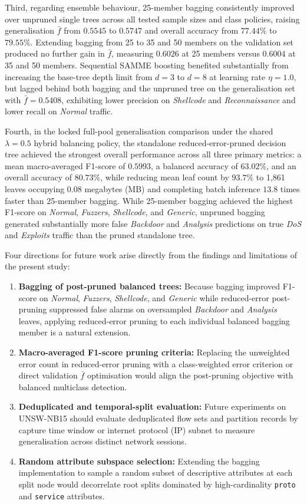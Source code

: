 Third, regarding ensemble behaviour, 25-member bagging consistently improved over unpruned single trees across all tested sample sizes and class policies, raising generalisation $\bar{f}$ from $0.5545$ to $0.5747$ and overall accuracy from $77.44\%$ to $79.55\%$. Extending bagging from 25 to 35 and 50 members on the validation set produced no further gain in $\bar{f}$, measuring $0.6026$ at 25 members versus $0.6004$ at 35 and 50 members. Sequential SAMME boosting benefited substantially from increasing the base-tree depth limit from $d = 3$ to $d = 8$ at learning rate $\eta = 1.0$, but lagged behind both bagging and the unpruned tree on the generalisation set with $\bar{f} = 0.5408$, exhibiting lower precision on \emph{Shellcode} and \emph{Reconnaissance} and lower recall on \emph{Normal} traffic.

Fourth, in the locked full-pool generalisation comparison under the shared $\lambda = 0.5$ hybrid balancing policy, the standalone reduced-error-pruned decision tree achieved the strongest overall performance across all three primary metrics: a mean macro-averaged F1-score of $0.5993$, a balanced accuracy of $63.02\%$, and an overall accuracy of $80.73\%$, while reducing mean leaf count by $93.7\%$ to 1,861 leaves occupying $0.08$ megabytes (MB) and completing batch inference $13.8$ times faster than 25-member bagging. While 25-member bagging achieved the highest F1-score on \emph{Normal}, \emph{Fuzzers}, \emph{Shellcode}, and \emph{Generic}, unpruned bagging generated substantially more false \emph{Backdoor} and \emph{Analysis} predictions on true \emph{DoS} and \emph{Exploits} traffic than the pruned standalone tree.

Four directions for future work arise directly from the findings and limitations of the present study:
\begin{enumerate}
    \item \textbf{Bagging of post-pruned balanced trees:} Because bagging improved F1-score on \emph{Normal}, \emph{Fuzzers}, \emph{Shellcode}, and \emph{Generic} while reduced-error post-pruning suppressed false alarms on oversampled \emph{Backdoor} and \emph{Analysis} leaves, applying reduced-error pruning to each individual balanced bagging member is a natural extension.
    \item \textbf{Macro-averaged F1-score pruning criteria:} Replacing the unweighted error count in reduced-error pruning with a class-weighted error criterion or direct validation $\bar{f}$ optimisation would align the post-pruning objective with balanced multiclass detection.
    \item \textbf{Deduplicated and temporal-split evaluation:} Future experiments on UNSW-NB15 should evaluate deduplicated flow sets and partition records by capture time window or internet protocol (IP) subnet to measure generalisation across distinct network sessions.
    \item \textbf{Random attribute subspace selection:} Extending the bagging implementation to sample a random subset of descriptive attributes at each split node would decorrelate root splits dominated by high-cardinality \texttt{proto} and \texttt{service} attributes.
\end{enumerate}
